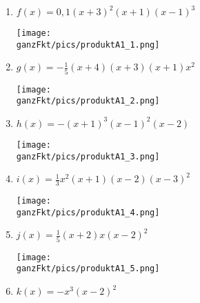 \begin{Answer}[ref=ganzProduktA1]

	\begin{minipage}{\textwidth}
		\begin{minipage}{0.5\textwidth}
			\begin{enumerate}[label=\alph*)]
				\item \(f(x)=0,1\left(x+3\right)^2\left(x+1\right)\left(x-1\right)^3\)

                \begin{minipage}[t]{0.8\textwidth}
					\texttt{[image: \\ganzFkt/pics/produktA1\_1.png]}
				\end{minipage}%
				\item \(g(x)=-\frac{1}{5}\left(x+4\right) \left(x+3\right) \left(x+1\right) x^2 \)

                \begin{minipage}[t]{0.8\textwidth}
					\texttt{[image: \\ganzFkt/pics/produktA1\_2.png]}
				\end{minipage}%
				\item \(h(x)=-\left(x+1\right)^3 \left(x-1\right)^2 \left(x-2\right)\)

                \begin{minipage}[t]{0.8\textwidth}
					\texttt{[image: \\ganzFkt/pics/produktA1\_3.png]}
				\end{minipage}%
				\item \(i(x)=\frac{1}{3}x^2\left(x+1\right) \left( x-2\right) \left( x-3\right) ^2\)

                \begin{minipage}[t]{0.8\textwidth}
					\texttt{[image: \\ganzFkt/pics/produktA1\_4.png]}
				\end{minipage}%
			\end{enumerate}
		\end{minipage}%
		\begin{minipage}{0.5\textwidth}
			\begin{enumerate}[label=\alph*)]
				\setcounter{enumi}{4}
				\item \(j(x)=\frac{1}{5}\left( x+2\right) x\left( x-2\right) ^2\)

                \begin{minipage}[t]{0.8\textwidth}
					\texttt{[image: \\ganzFkt/pics/produktA1\_5.png]}
				\end{minipage}%
				\item \(k(x)=-x^3\left( x-2\right) ^2\)


\end{enumerate}
\end{minipage}
\end{minipage}
\end{Answer}
